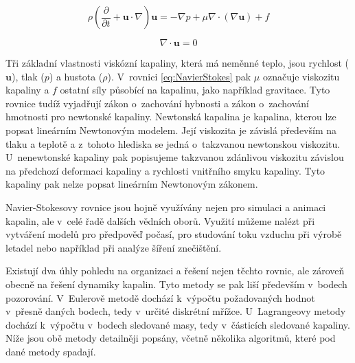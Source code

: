 \begin{equation}
	\rho\left(\frac{\partial}{\partial t} + \mathbf{u} \cdot \nabla\right)\mathbf{u} = -\nabla p + \mu\nabla\cdot(\nabla \mathbf{u}) + f
	\label{eq:NavierStokes}
\end{equation}

\begin{equation}
	\nabla \cdot \mathbf{u} = 0
	\label{eq:NavierStokes2}
\end{equation}

Tři základní vlastnosti viskózní kapaliny, která má neměnné teplo, jsou rychlost ($\mathbf{u}$), tlak ($p$) a hustota ($\rho$). V~rovnici \ref{eq:NavierStokes} pak $\mu$ označuje viskozitu kapaliny a $f$ ostatní síly působící na kapalinu, jako například gravitace. Tyto rovnice tudíž vyjadřují zákon o~zachování hybnosti a zákon o~zachování hmotnosti pro newtonské kapaliny. Newtonská kapalina je kapalina, kterou lze popsat lineárním Newtonovým modelem. Její viskozita je závislá především na tlaku a teplotě a z~tohoto hlediska se jedná o~takzvanou newtonskou viskozitu. U~nenewtonské kapaliny pak popisujeme takzvanou zdánlivou viskozitu závislou na předchozí deformaci kapaliny a rychlosti vnitřního smyku kapaliny. Tyto kapaliny pak nelze popsat lineárním Newtonovým zákonem.\cite{StejskalJan2013Pmks}

Navier-Stokesovy rovnice jsou hojně využívány nejen pro simulaci a animaci kapalin, ale v~celé řadě dalších vědních oborů. Využití můžeme nalézt při vytváření modelů pro předpověď počasí, pro studování toku vzduchu při výrobě letadel nebo například při analýze šíření znečištění.
\break

Existují dva úhly pohledu na organizaci a řešení nejen těchto rovnic, ale zároveň obecně na řešení dynamiky kapalin. Tyto metody se pak liší především v~bodech pozorování. V~Eulerově metodě dochází k~výpočtu požadovaných hodnot v~přesně daných bodech, tedy v~určité diskrétní mřížce. U~Lagrangeovy metody dochází k~výpočtu v~bodech sledované masy, tedy v~částicích sledované kapaliny. Níže jsou obě metody detailněji popsány, včetně několika algoritmů, které pod dané metody spadají.

